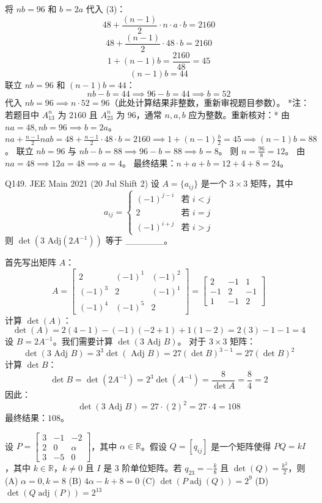 \begin{questions}
\begin{solution}
将 $nb=96$ 和 $b=2a$ 代入 (3)：
\[ 48 + \frac{(n-1)}{2} \cdot n \cdot a \cdot b = 2160 \]
\[ 48 + \frac{(n-1)}{2} \cdot 48 \cdot b = 2160 \]
\[ 1 + (n-1)b = \frac{2160}{48} = 45 \]
\[ (n-1)b = 44 \]
联立 $nb = 96$ 和 $(n-1)b = 44$：
\[ nb - b = 44 \implies 96 - b = 44 \implies b = 52 \]
代入 $nb = 96 \implies n \cdot 52 = 96$（此处计算结果非整数，重新审视题目参数）。
*注：若题目中 $A^n_{13}$ 为 $2160$ 且 $A^n_{23}$ 为 $96$，通常 $n, a, b$ 应为整数。重新核对：*
由 $na=48, nb=96 \implies b=2a$。
$na + \frac{n-1}{2} n a b = 48 + \frac{n-1}{2} \cdot 48 \cdot b = 2160 \implies 1 + (n-1) \frac{b}{2} = 45 \implies (n-1)b = 88$。
联立 $nb=96$ 与 $nb-b=88 \implies 96-b=88 \implies b=8$。
则 $n = \frac{96}{8} = 12$。
由 $na = 48 \implies 12a = 48 \implies a = 4$。
最终结果：$n + a + b = 12 + 4 + 8 = 24$。
\end{solution}

\question
Q149. JEE Main 2021 (20 Jul Shift 2)
设 $A = \{a_{ij}\}$ 是一个 $3 \times 3$ 矩阵，其中
\[ a_{ij} = \begin{cases} (-1)^{j-i} & \text{若 } i < j \\ 2 & \text{若 } i = j \\ (-1)^{i+j} & \text{若 } i > j \end{cases} \]
则 $\det(3 \text{ Adj} (2A^{-1}))$ 等于 \_\_\_\_\_\_。

\begin{solution}
首先写出矩阵 $A$：
\[ A = \begin{bmatrix} 2 & (-1)^1 & (-1)^2 \\ (-1)^3 & 2 & (-1)^1 \\ (-1)^4 & (-1)^5 & 2 \end{bmatrix} = \begin{bmatrix} 2 & -1 & 1 \\ -1 & 2 & -1 \\ 1 & -1 & 2 \end{bmatrix} \]
计算 $\det(A)$：
\[ \det(A) = 2(4-1) - (-1)(-2+1) + 1(1-2) = 2(3) - 1 - 1 = 4 \]
设 $B = 2A^{-1}$。我们需要计算 $\det(3 \text{ Adj } B)$。
对于 $3 \times 3$ 矩阵：
\[ \det(3 \text{ Adj } B) = 3^3 \det(\text{ Adj } B) = 27 (\det B)^{3-1} = 27 (\det B)^2 \]
计算 $\det B$：
\[ \det B = \det(2A^{-1}) = 2^3 \det(A^{-1}) = \frac{8}{\det A} = \frac{8}{4} = 2 \]
因此：
\[ \det(3 \text{ Adj } B) = 27 \cdot (2)^2 = 27 \cdot 4 = 108 \]
最终结果：$108$。
\end{solution}

\question 设 $P = \begin{bmatrix} 3 & -1 & -2 \\ 2 & 0 & \alpha \\ 3 & -5 & 0 \end{bmatrix}$，其中 $\alpha \in \mathbb{R}$。假设 $Q = [q_{ij}]$ 是一个矩阵使得 $PQ = kI$，其中 $k \in \mathbb{R}$，$k \neq 0$ 且 $I$ 是 3 阶单位矩阵。若 $q_{23} = -\frac{k}{8}$ 且 $\det(Q) = \frac{k^2}{2}$，则
(A) $\alpha = 0, k = 8$
(B) $4\alpha - k + 8 = 0$
(C) $\det(P \operatorname{adj}(Q)) = 2^9$
(D) $\det(Q \operatorname{adj}(P)) = 2^{13}$


\end{questions}
